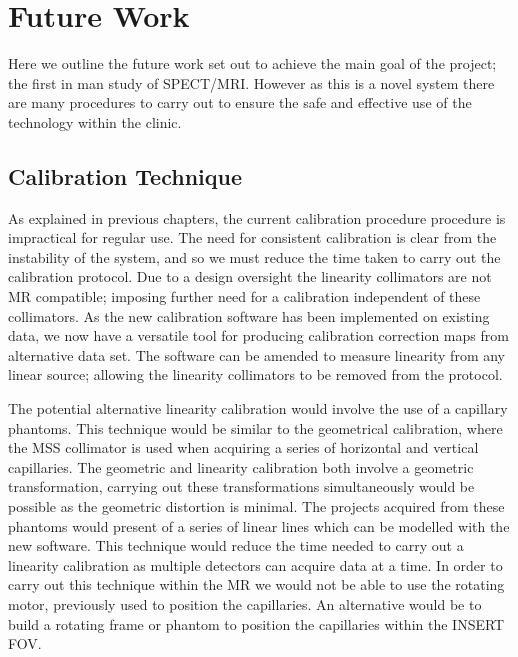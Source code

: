 \chapter{Future Work}
\label{Future}



Here we outline the future work set out to achieve the main goal of the project; the first in man study of \acrshort{SPECT/MRI}. However as this is a novel system there are many procedures to carry out to ensure the safe and effective use of the technology within the clinic.
\section{Calibration Technique}
As explained in previous chapters, the current calibration procedure procedure is impractical for regular use. The need for consistent calibration is clear from the instability of the system, and so we must reduce the time taken to carry out the calibration protocol. Due to a design oversight the linearity collimators are not \acrshort{MR} compatible; imposing further need for a calibration independent of these collimators. As the new calibration software has been implemented on existing data, we now have a versatile tool for producing calibration correction maps from alternative data set. The software can be amended to measure linearity from any linear source; allowing the linearity collimators to be removed from the protocol. 

The potential alternative linearity calibration would involve the use of a capillary phantoms. This technique would be similar to the geometrical calibration, where the \acrshort{MSS} collimator is used when acquiring a series of horizontal and vertical capillaries. The geometric and linearity calibration both involve a geometric transformation, carrying out these transformations simultaneously would be possible as the geometric distortion is minimal. The projects acquired from these phantoms would present of a series of linear lines which can be modelled with the new software. This technique would reduce the time needed to carry out a linearity calibration as multiple detectors can acquire data at a time. In order to carry out this technique within the \acrshort{MR} we would not be able to use the rotating motor, previously used to position the capillaries. An alternative would be to build a rotating frame or phantom to position the capillaries within the \acrshort{INSERT}  \acrshort{FOV}.

